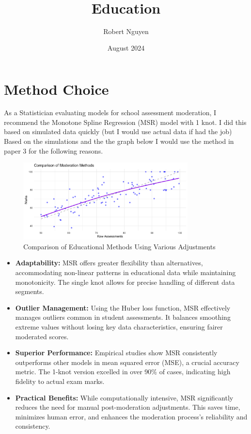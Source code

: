 \documentclass{article}
\title{Education}
\author{Robert Nguyen}
\date{August 2024}
\begin{document}
\maketitle

\section{Method Choice}
As a Statistician evaluating models for school assessment moderation, I recommend the Monotone Spline Regression (MSR) model with 1 knot. I did this based on simulated data quickly (but I would use actual data if had the job)
Based on the simulations and the the graph below I would use the method in paper 3 for the following reasons.

\begin{figure}[h!]
    \centering
    \includegraphics[width=0.8\textwidth]{education_methods_plot.png}
    \caption{Comparison of Educational Methods Using Various Adjustments}
    \label{fig:education_methods}
\end{figure}

\begin{itemize}
    \item \textbf{Adaptability:} MSR offers greater flexibility than alternatives, accommodating non-linear patterns in educational data while maintaining monotonicity. The single knot allows for precise handling of different data segments.
    
    \item \textbf{Outlier Management:} Using the Huber loss function, MSR effectively manages outliers common in student assessments. It balances smoothing extreme values without losing key data characteristics, ensuring fairer moderated scores.
    
    \item \textbf{Superior Performance:} Empirical studies show MSR consistently outperforms other models in mean squared error (MSE), a crucial accuracy metric. The 1-knot version excelled in over 90\% of cases, indicating high fidelity to actual exam marks.
    
    \item \textbf{Practical Benefits:} While computationally intensive, MSR significantly reduces the need for manual post-moderation adjustments. This saves time, minimizes human error, and enhances the moderation process's reliability and consistency.
\end{itemize}
\end{document}

